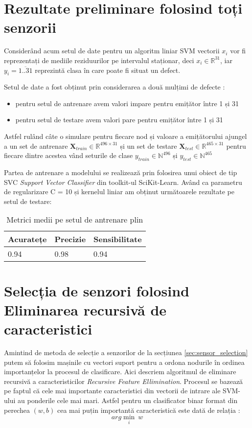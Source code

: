 \section{Rezultate preliminare folosind toți senzorii}

Considerând acum setul de date pentru un algoritm liniar SVM vectorii $x_i$ vor fi reprezentați de mediile reziduurilor pe intervalul staționar, deci $x_i \in \mathbb{R}^{31}$, iar $y_{i} = \overline{1..31}$ reprezintă clasa în care poate fi situat un defect.

Setul de date a fost obținut prin considerarea a două mulțimi de defecte \cite{irofti2017dictionary}:
\begin{itemize}
    \item pentru setul de antrenare avem valori impare pentru emițător între 1 și 31
    \item pentru setul de testare avem valori pare pentru emițător între 1 și 31
\end{itemize}

Astfel rulând câte o simulare pentru fiecare nod și valoare a emițătorului ajungel a un set de antrenare $\mathbf{X}_{train} \in \mathbb{R}^{496\times 31}$ și un set de testare $\mathbf{X}_{test} \in \mathbb{R}^{465\times 31}$ pentru fiecare dintre acestea vând seturile de clase $y_{train} \in \mathbb{N}^{496}$ și $y_{test} \in \mathbb{N}^{465}$

Partea de antrenare a modelului se realizează prin folosirea unui obiect de tip SVC \textit{Support Vector Classifier} din toolkit-ul SciKit-Learn. Având ca parametru de regularizare C = 10 și kernelul liniar am obținut următoarele rezultate pe setul de testare:

\begin{table}[h]
\centering
\begin{tabular}{ |p{3cm}|p{3cm}|p{3cm}|}
\hline
Acuratețe & Precizie & Sensibilitate\\
 \hline
0.94    &  0.98     & 0.94 \\
 \hline
\end{tabular}
\caption{Metrici medii pe setul de antrenare plin}
\label{tbl:full_sensor_results}
\end{table}


\section{Selecția de senzori folosind Eliminarea recursivă de caracteristici}
Amintind de metoda de selecție a senzorilor de la secțiunea \ref{sec:sensor_selection} putem să folosim mașinile cu vectori suport pentru a ordona nodurile în ordinea importanțelor la procesul de clasificare. Aici descriem algoritmul de eliminare recursivă a caracteristicilor \textit{Recursive Feature Ellimination}. Procesul se bazează pe faptul că cele mai importante caracteristici din vectorii de intrare ale SVM-ului au ponderile cele mai mari. Astfel pentru un clasificator binar format din perechea $(w, b)$ cea mai puțin importantă caracteristică este dată de relația \cite{RFE_PAPER}: 
\begin{equation}
    arg\min_{i} ~ w
\end{equation}

